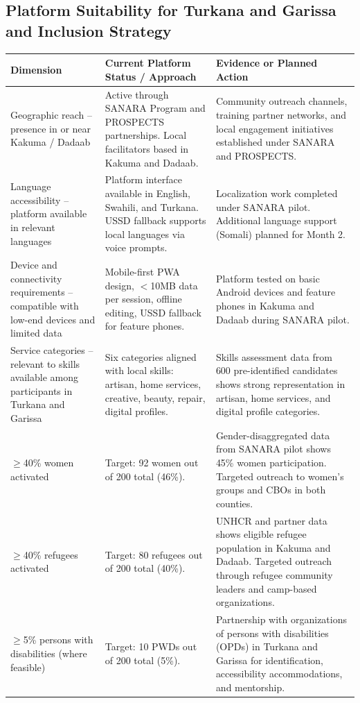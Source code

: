 \documentclass[11pt,a4paper]{article}
\begin{document}
\subsection{Platform Suitability for Turkana and Garissa and Inclusion Strategy}
\begin{longtable}{@{}p{6cm}p{5cm}p{5cm}@{}}
\textbf{Dimension} & \textbf{Current Platform Status / Approach} & \textbf{Evidence or Planned Action} \\
\hline
Geographic reach -- presence in or near Kakuma / Dadaab & Active through SANARA Program and PROSPECTS partnerships. Local facilitators based in Kakuma and Dadaab. & Community outreach channels, training partner networks, and local engagement initiatives established under SANARA and PROSPECTS. \\
\hline
Language accessibility -- platform available in relevant languages & Platform interface available in English, Swahili, and Turkana. USSD fallback supports local languages via voice prompts. & Localization work completed under SANARA pilot. Additional language support (Somali) planned for Month 2. \\
\hline
Device and connectivity requirements -- compatible with low-end devices and limited data & Mobile-first PWA design, $<$10MB data per session, offline editing, USSD fallback for feature phones. & Platform tested on basic Android devices and feature phones in Kakuma and Dadaab during SANARA pilot. \\
\hline
Service categories -- relevant to skills available among participants in Turkana and Garissa & Six categories aligned with local skills: artisan, home services, creative, beauty, repair, digital profiles. & Skills assessment data from 600 pre-identified candidates shows strong representation in artisan, home services, and digital profile categories. \\
\hline
$\geq$40\% women activated & Target: 92 women out of 200 total (46\%). & Gender-disaggregated data from SANARA pilot shows 45\% women participation. Targeted outreach to women's groups and CBOs in both counties. \\
\hline
$\geq$40\% refugees activated & Target: 80 refugees out of 200 total (40\%). & UNHCR and partner data shows eligible refugee population in Kakuma and Dadaab. Targeted outreach through refugee community leaders and camp-based organizations. \\
\hline
$\geq$5\% persons with disabilities (where feasible) & Target: 10 PWDs out of 200 total (5\%). & Partnership with organizations of persons with disabilities (OPDs) in Turkana and Garissa for identification, accessibility accommodations, and mentorship. \\
\end{longtable}
\end{document}
